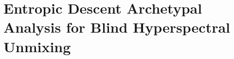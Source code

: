 
\lhead[\fancyplain{}{\leftmark}]%
      {\fancyplain{}{}} %
\chead[\fancyplain{}{}]%
      {\fancyplain{}{}}
\rhead[\fancyplain{}{}]%
      {\fancyplain{}{\rightmark}}%
\lfoot[\fancyplain{}{}]%
      {\fancyplain{}{}}
\cfoot[\fancyplain{}{\thepage}]%
      {\fancyplain{}{\thepage}} %
\rfoot[\fancyplain{}{}]%
     {\fancyplain{}{\scriptsize}}



\chapter{Entropic Descent Archetypal Analysis for Blind Hyperspectral Unmixing}
\label{ch:EDAA}


